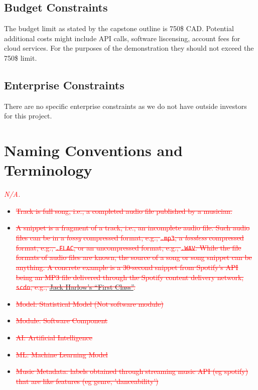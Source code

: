 \documentclass[12pt]{article}
\begin{document}
\subsection{Budget Constraints}
The budget limit as stated by the capstone outline is 750\$ CAD. Potential additional
costs might include API calls, software liscensing, account fees for cloud services. 
For the purposes of the demonstration they should not exceed the 750\$ limit. 

\subsection{Enterprise Constraints}
There are no specific enterprise constraints as we do not have outside investors
for this project. 

\section{Naming Conventions and Terminology}
\textcolor{red}{\emph{N/A.}}
\begin{itemize}
  \item \textcolor{red}{\sout{Track is full song, i.e., a completed audio file published by a musician. }}
  \item\textcolor{red}{\sout{ A snippet is a fragment of a track, i.e., an incomplete audio file. Such audio files can be in a \emph{lossy} compressed format, e.g., 
  \texttt{.mp3}, a \emph{lossless} compressed format, e.g., \texttt{.FLAC}, or an uncompressed format, e.g., \texttt{.WAV}. While the file formats of audio files are known, 
  the source of a song or song snippet can be anything. A concrete example is a 30-second snippet from Spotify's API being an MP3 file delivered through the Spotify content 
  delivery network, \texttt{scdn}, e.g., \href{https://p.scdn.co/mp3-preview/c05a687254dbdf50a9ab4879d85e54a7594e367f?cid=945b9ed74f4c43b49bcf26e7dc388df0}{Jack Harlow's ``First Class''}.}}
  \item \textcolor{red}{\sout{Model: Statistical Model (Not software module)}}
  \item \textcolor{red}{\sout{Module: Software Component}}
  \item \textcolor{red}{\sout{AI: Artificial Intelligence}}
  \item \textcolor{red}{\sout{ML: Machine Learning Model}}
  \item \textcolor{red}{\sout{Music Metadata: labels obtained through streaming music API (eg spotify) that are
  like features (eg genre, 'danceability')}}
\end{itemize}
\end{document}

